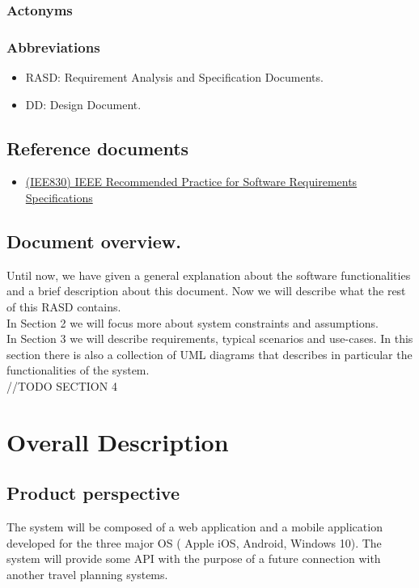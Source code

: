 \documentclass{report}
\begin{document}
		\subsection{Actonyms}

		\subsection{Abbreviations}
		\begin{itemize}
			\item RASD: Requirement Analysis and Specification Documents.
			\item DD: Design Document.
		\end{itemize}
		
	\section{Reference documents}
		\begin{itemize}
			\item \href{http://www.math.uaa.alaska.edu/~afkjm/cs401/IEEE830.pdf}{(IEE830) IEEE Recommended Practice for Software Requirements Specifications}
		\end{itemize}
		
	\section{Document overview.}
	Until now, we have given a general explanation about the software functionalities and a brief description about this document. Now we will describe what the rest of this RASD contains.\\
	In Section 2 we will focus more about system constraints and assumptions.\\
	In Section 3 we will describe requirements, typical scenarios and use-cases. In this section there is also a collection of UML diagrams that describes in particular the functionalities of the system.\\
	//TODO SECTION 4
		
\chapter{Overall Description}
	
	\section{Product perspective}
	The system will be composed of a web application and a mobile application developed for the three major OS ( Apple iOS, Android, Windows 10). The system will provide some API with the purpose of a future connection with another travel planning systems. 
		
\end{document}
